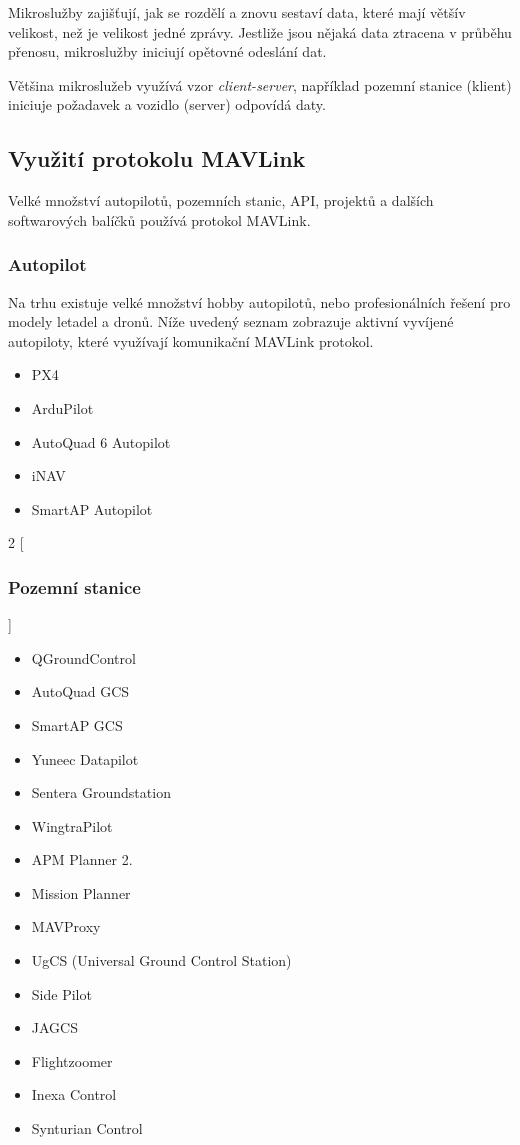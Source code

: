 Mikroslužby zajišťují, jak se rozdělí a znovu sestaví data, které mají většív velikost, než je velikost jedné zprávy. Jestliže jsou nějaká data ztracena v průběhu přenosu, mikroslužby iniciují opětovné odeslání dat.

Většina mikroslužeb využívá vzor \textit{client-server}, například pozemní stanice (klient) iniciuje požadavek a vozidlo (server) odpovídá daty.

\subsection{Využití protokolu MAVLink}

Velké množství autopilotů, pozemních stanic, \acs{API}, projektů a dalších softwarových balíčků používá protokol MAVLink.

\subsubsection{Autopilot}

Na trhu existuje velké množství hobby autopilotů, nebo profesionálních řešení pro modely letadel a dronů. Níže uvedený seznam zobrazuje aktivní vyvíjené autopiloty, které využívají komunikační MAVLink protokol.  \cite{MAVLINK}

\begin{itemize}
    \item PX4
    \item ArduPilot
    \item AutoQuad 6 Autopilot
    \item iNAV
    \item SmartAP Autopilot\\
\end{itemize}


\begin{multicols}{2}
[
\subsubsection{Pozemní stanice}
]
    \begin{itemize}
        \item QGroundControl
        \item AutoQuad GCS
        \item SmartAP GCS
        \item Yuneec Datapilot
        \item Sentera Groundstation
        \item WingtraPilot
        \item APM Planner 2.
        \item Mission Planner
        \item MAVProxy
        \item UgCS (Universal Ground Control Station)
        \item Side Pilot
        \item JAGCS
        \item Flightzoomer
        \item Inexa Control
        \item Synturian Control
    \end{itemize}
\end{multicols}

